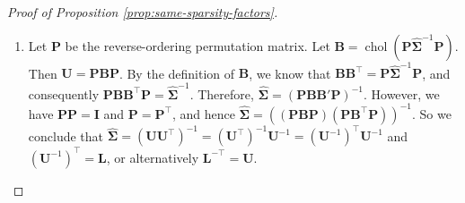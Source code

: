 \documentclass[12pt,letterpaper]{article}
\theoremstyle{propstyle}
\theoremstyle{propstyle}
\theoremstyle{propstyle}
\theoremstyle{propstyle}
\theoremstyle{propstyle}
\newcommand{\bP}{\mathbf{P}}
\newcommand{\bL}{\mathbf{L}}
\newcommand{\bI}{\mathbf{I}}
\newcommand{\bU}{\mathbf{U}}
\newcommand{\bB}{\mathbf{B}}
\newcommand{\bfSigma}{\bm{\Sigma}}
\DeclareMathOperator*{\chol}{chol}
\begin{document}
\begin{proof}[Proof of Proposition \ref{prop:same-sparsity-factors}]
\begin{enumerate}
\item 
Let $\bP$ be the reverse-ordering permutation matrix.
Let $\bB = \chol(\bP\hat{\bfSigma}^{-1}\bP)$. Then $\bU = \bP\bB\bP$. By the definition of $\bB$, we know that $\bB\bB^\top = \bP\hat{\bfSigma}^{-1}\bP$, and consequently $\bP\bB\bB^\top\bP = \hat{\bfSigma}^{-1}$. Therefore, $\hat{\bfSigma} = \left(\bP\bB\bB'\bP\right)^{-1}$. However, we have $\bP\bP = \bI$ and $\bP = \bP^\top$, and hence $
\hat{\bfSigma} = \left((\bP\bB\bP)(\bP\bB^\top\bP)\right)^{-1}$. So we conclude that $\hat{\bfSigma} = (\bU\bU^\top)^{-1} = (\bU^\top)^{-1}\bU^{-1} = (\bU^{-1})^\top\bU^{-1}$ and $(\bU^{-1})^\top = \bL$, or alternatively $\bL^{-\top} = \bU$.
\end{enumerate}
\end{proof}




\end{document}
